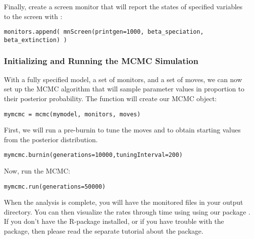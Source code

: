 Finally, create a screen monitor that will report the states of specified variables to the screen with :
{\tt \begin{snugshade*}
\begin{lstlisting}
monitors.append( mnScreen(printgen=1000, beta_speciation, beta_extinction) )
\end{lstlisting}
\end{snugshade*}}

\subsubsection{Initializing and Running the MCMC Simulation}

With a fully specified model, a set of monitors, and a set of moves, we can now set up the MCMC algorithm that will sample parameter values in proportion to their posterior probability. The  function will create our MCMC object:
{\tt \begin{snugshade*}
\begin{lstlisting}
mymcmc = mcmc(mymodel, monitors, moves)
\end{lstlisting}
\end{snugshade*}}

First, we will run a pre-burnin to tune the moves and to obtain starting values from the posterior distribution.
{\tt \begin{snugshade*}
\begin{lstlisting}
mymcmc.burnin(generations=10000,tuningInterval=200)
\end{lstlisting}
\end{snugshade*}}


Now, run the MCMC:
{\tt \begin{snugshade*}
\begin{lstlisting}
mymcmc.run(generations=50000)
\end{lstlisting}
\end{snugshade*}}

When the analysis is complete, you will have the monitored files in your output directory.
You can then visualize the rates through time using \R using our package \RevGadgets.
If you don't have the R-package \RevGadgets installed, or if you have trouble with the package, then please read the separate tutorial about the package.

